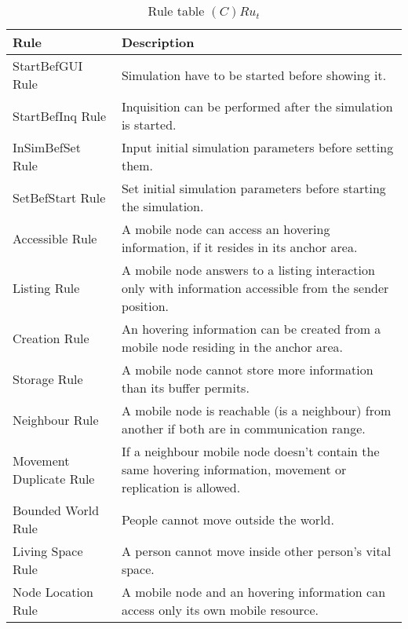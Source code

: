 \begin{table}[H]
	\centering
	\begin{tabular}{|p{4cm}|p{8cm}|}
			\hline
			\textbf{Rule} & \textbf{Description} \\
			\hline
			StartBefGUI Rule & Simulation have to be started before showing it.\\
			\hline
			StartBefInq Rule & Inquisition can be performed after the simulation is
			started.\\
			\hline
			InSimBefSet Rule & Input initial simulation parameters before setting
			them.  \\
			\hline
			SetBefStart Rule & Set initial simulation parameters before starting the
			simulation.  \\
			\hline
			Accessible Rule & A mobile node can access an hovering information, if it
			resides in its anchor area. \\
			\hline
			Listing Rule & A mobile node answers to a listing interaction only with
			information accessible from the sender position. \\
			\hline
			Creation Rule & An hovering information can be created from a mobile node
			residing in the anchor area. \\
			\hline
			Storage Rule & A mobile node cannot store more information than its
			buffer permits. \\
			\hline
			Neighbour Rule & A mobile node is reachable (is a neighbour) from
			another if both are in communication range. \\
			\hline
			Movement Duplicate Rule & If a neighbour mobile node doesn't contain the same
			hovering information, movement or replication is allowed. \\
			\hline
			Bounded World Rule & People cannot move outside the world. \\
			\hline
			Living Space Rule & A person cannot move inside other person's vital space. \\
			\hline
			Node Location Rule & A mobile node and an hovering information can access
			only its own mobile resource. \\
			\hline
		\end{tabular}
	\caption{Rule table $(C)Ru_t$}
	\label{tab:crut}
\end{table}

